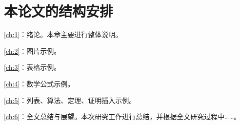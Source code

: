 \section{本论文的结构安排}
\cref{ch:1}：绪论。本章主要进行整体说明。

\cref{ch:2}：图片示例。

\cref{ch:3}：表格示例。

\cref{ch:4}：数学公式示例。

\cref{ch:5}：列表、算法、定理、证明插入示例。

\cref{ch:6}：全文总结与展望。本次研究工作进行总结，并根据全文研究过程中……。


